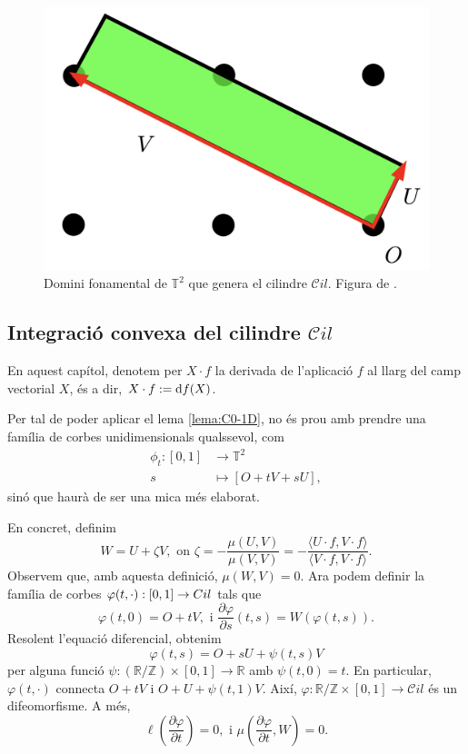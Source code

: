 \begin{figure}[htbp]
    \centering
    \includegraphics[height=0.3\textwidth]{domini.png}
    \caption{Domini fonamental de $\mathbb T^2$ que genera el cilindre $\mathcal Cil$. Figura de \citet{borrelli2013}.}
    \label{fig:setena_foto}
\end{figure}

\subsection{Integració convexa del cilindre $\mathcal Cil$}
\begin{nota}
    En aquest capítol, denotem per $X\cdot f$ la derivada de l'aplicació $f$ al llarg del camp vectorial $X$, és a dir, $X\cdot f := \text df(X)$.
\end{nota}
Per tal de poder aplicar el lema \ref{lema:C0-1D}, no és prou amb prendre una família de corbes unidimensionals qualssevol, com
\begin{align}
    \nonumber\phi_t:[0,1]&\to\mathbb T^2\\
    \nonumber s&\mapsto [O+tV+sU],
\end{align}
sinó que haurà de ser una mica més elaborat. 

En concret, definim 
\begin{equation*}
    W=U+\zeta V, \text{ on } \zeta = -\frac{\mu(U,V)}{\mu(V,V)} = -\frac{\langle U\cdot f, V\cdot f\rangle}{\langle V\cdot f, V\cdot f\rangle}.
\end{equation*}
Observem que, amb aquesta definició, $\mu(W,V)=0$. Ara podem definir la família de corbes $\varphi(t,\cdot):[0,1]\to\mathbb \mathcal Cil$ tals que 
\begin{equation*}
    \varphi(t,0) = O + tV, \text{ i } \frac{\partial\varphi}{\partial s}(t,s) = W(\varphi(t,s)).
\end{equation*}
Resolent l'equació diferencial, obtenim
\begin{equation*}
    \varphi(t,s) = O + sU + \psi(t,s)V
\end{equation*}
per alguna funció $\psi:(\mathbb R/\mathbb Z)\times[0,1]\to\mathbb R$ amb $\psi(t,0)=t$. En particular, $\varphi(t,\cdot)$ connecta $O+tV$ i $O+U+\psi(t,1)V$. Així, $\varphi:\mathbb R/\mathbb Z\times[0,1]\to\mathcal Cil$ és un difeomorfisme. A més, 
\begin{equation*}
    \ell\left( \frac{\partial\varphi}{\partial t} \right) = 0, \text{ i } \mu\left( \frac{\partial\varphi}{\partial t}, W \right) = 0.
\end{equation*}

